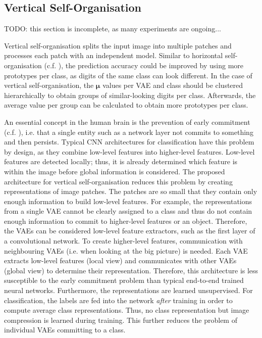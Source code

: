\subsection{Vertical Self-Organisation}
TODO: this section is incomplete, as many experiments are ongoing...

Vertical self-organisation splits the input image into multiple patches and processes each patch with an independent model.
Similar to horizontal self-organisation (c.f. ), the prediction accuracy could be improved by using more prototypes per class, as digits of the same class can look different. In the case of vertical self-organisation, the $\boldsymbol{\mu}$ values per VAE and class should be clustered hierarchically to obtain groups of similar-looking digits per class. Afterwards, the average value per group can be calculated to obtain more prototypes per class.

An essential concept in the human brain is the prevention of early commitment  (c.f. ), i.e. that a single entity such as a network layer not commits to something and then persists. Typical CNN architectures for classification have this problem by design, as they combine low-level features into higher-level features. Low-level features are detected locally; thus, it is already determined which feature is within the image before global information is considered. The proposed architecture for vertical self-organisation reduces this problem by creating representations of image patches. The patches are so small that they contain only enough information to build low-level features. For example, the representations from a single VAE cannot be clearly assigned to a class and thus do not contain enough information to commit to higher-level features or an object. Therefore, the VAEs can be considered low-level feature extractors, such as the first layer of a convolutional network. To create higher-level features, communication with neighbouring VAEs (i.e. when looking at the big picture) is needed. Each VAE extracts low-level features (local view) and communicates with other VAEs (global view) to determine their representation. Therefore, this architecture is less susceptible to the early commitment problem than typical end-to-end trained neural networks.
Furthermore, the representations are learned unsupervised. For classification, the labels are fed into the network \emph{after} training in order to compute average class representations. Thus, no class representation but image compression is learned during training. This further reduces the problem of individual VAEs committing to a class.

